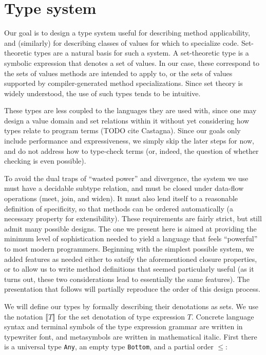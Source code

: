 \section{Type system}

Our goal is to design a type system useful for describing method applicability,
and (similarly) for describing classes of values for which to specialize code.
Set-theoretic types are a natural basis for such a system.
A set-theoretic type is a symbolic expression that denotes a set of values.
In our case, these correspond to the sets of values methods are intended to apply
to, or the sets of values supported by compiler-generated method specializations.
Since set theory is widely understood, the use of such types tends to be intuitive.

These types
are less coupled to the languages they are used with, since one may design
a value domain and set relations within it without yet considering how types
relate to program terms (TODO cite Castagna). Since our goals only include
performance and expressiveness, we simply skip the later steps for now, and do
not address how to type-check terms (or, indeed, the question of whether checking
is even possible).

To avoid the dual traps of ``wasted power'' and divergence, the system we use
must have a decidable subtype relation, and must be closed under data-flow operations
(meet, join, and widen). It must also lend itself to a reasonable definition of
specificity, so that methods can be ordered automatically (a necessary property for
extensibility). These requirements are fairly strict, but still admit many possible
designs. The one we present here is aimed at providing the minimum level of
sophistication needed to yield a language that feels ``powerful'' to most modern
programmers. Beginning with the simplest possible system, we added features as
needed either to satsify the aforementioned closure properties, or to allow us to
write method definitions that seemed particularly useful (as it turns out, these
two considerations lead to essentially the same features). The presentation that
follows will partially reproduce the order of this design process.

We will define our types by formally describing their denotations as sets.
We use the notation $\llbracket T \rrbracket$ for the set denotation of
type expression $T$.
Concrete language syntax and terminal symbols of the type expression grammar
are written in typewriter font, and metasymbols are written in mathematical italic.
First there is a universal type \texttt{Any}, an empty type \texttt{Bottom}, and
a partial order $\leq$:


